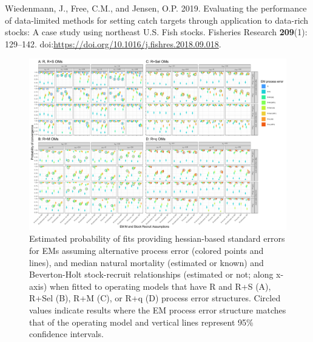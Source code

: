 \documentclass[
  12pt,
]{article}
\newlength{\cslhangindent}
\newlength{\cslentryspacingunit} %
\newenvironment{CSLReferences}[2] %
 {%
  \setlength{\parindent}{0pt}
  \ifodd #1
  \let\oldpar\par
  \def\par{\hangindent=\cslhangindent\oldpar}
  \fi
  \setlength{\parskip}{#2\cslentryspacingunit}
 }%
 {}
\begin{document}
\begin{CSLReferences}{1}{0}
\leavevmode{}%
Wiedenmann, J., Free, C.M., and Jensen, O.P. 2019. Evaluating the
performance of data-limited methods for setting catch targets through
application to data-rich stocks: A case study using northeast {U.S.}
Fish stocks. Fisheries Research \textbf{209}(1): 129--142.
doi:\url{https://doi.org/10.1016/j.fishres.2018.09.018}.

\end{CSLReferences}

\pagebreak

\clearpage

\begin{landscape}
\begin{figure}
\begin{center}
\includegraphics{type_4_convergence_plots}
\end{center}
\caption{Estimated probability of fits providing hessian-based standard errors for EMs assuming alternative process error (colored points and lines), and median natural mortality (estimated or known) and Beverton-Holt stock-recruit relationships (estimated or not; along x-axis) when fitted to operating models that have R and R+S (A), R+Sel (B), R+M (C), or R+q (D) process error structures. Circled values indicate results where the EM process error structure matches that of the operating model and vertical lines represent 95\% confidence intervals.}\label{hessian_SE_convergence}
\end{figure}
\end{landscape}

\clearpage
\end{document}
